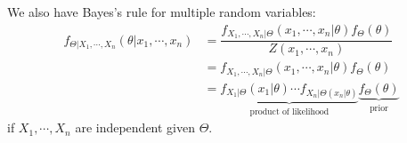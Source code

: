 We also have Bayes's rule for multiple random variables:
\[
  \begin{aligned}
    f_{\Theta \vert X_1, \cdots, X_n} (\theta \vert x_1, \cdots, x_n) &= \dfrac{f_{X_1, \cdots, X_n \vert \Theta} (x_1, \cdots, x_n \vert \theta) f_{\Theta} (\theta)}{Z(x_1, \cdots, x_n)} \\
    &= f_{X_1, \cdots, X_n \vert \Theta} (x_1, \cdots, x_n \vert \theta) f_{\Theta} (\theta) \\ 
    &= \underbrace{f_{X_1 \vert \Theta} (x_1 \vert \theta) \cdots f_{X_n  \vert \Theta(x_n \vert \theta)}}_{\text{product of likelihood}} \underbrace{f_{\Theta} (\theta)}_{\text{prior}}
  \end{aligned}
\]
if \(X_1, \cdots, X_n\) are independent given \(\Theta\).  

